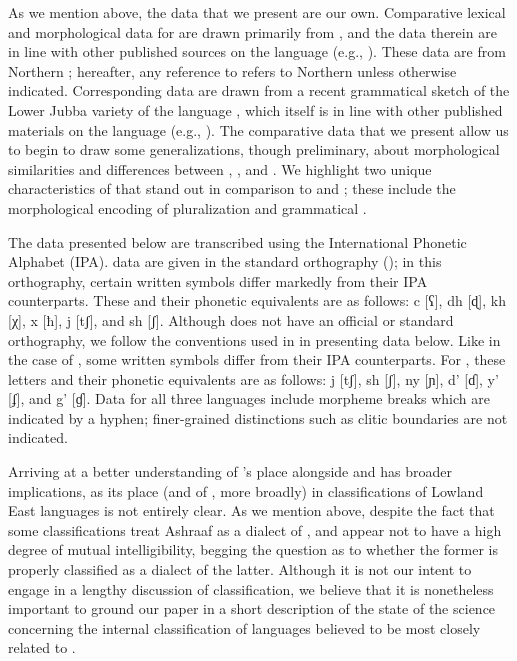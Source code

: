 \documentclass[output=paper]{../langsci/langscibook}
\begin{document}
 As we mention above, the  data that we present are our own. Comparative lexical and morphological data for  are drawn primarily from \citet{Greenetal2015}, and the data therein are in line with other published sources on the language (e.g., \citealt{Bell1953,Saeed1999}). These data are from Northern ; hereafter, any reference to  refers to Northern  unless otherwise indicated. Corresponding  data are drawn from a recent grammatical sketch of the Lower Jubba variety of the language \citet{PasterRanero2015}, which itself is in line with other published materials on the language (e.g., \citealt{Paster2007,Paster2010,PasterMaayGender}). The comparative data that we present allow us to begin to draw some generalizations, though preliminary, about morphological similarities and differences between , , and . We highlight two unique characteristics of  that stand out in comparison to  and ; these include the morphological encoding of pluralization and grammatical . 
 
 The  data presented below are transcribed using the International Phonetic Alphabet (IPA).  data are given in the standard  orthography (\citealt{Andrzejewski1978}); in this orthography, certain written symbols differ markedly from their IPA counterparts. These and their phonetic equivalents are as follows: c [ʕ], dh [ɖ], kh [χ], x [ħ], j [tʃ], and sh [ʃ]. Although  does not have an official or standard orthography, we follow the conventions used in \citet{PasterRanero2015} in presenting
 data below. Like in the case of , some  written symbols differ from their IPA counterparts. For , these letters and their phonetic equivalents are as follows: j [tʃ], sh [ʃ], ny [ɲ], d' [ɗ], y' [ʄ], and g' [ɠ]. Data for all three languages include morpheme breaks which are indicated by a hyphen; finer-grained distinctions such as clitic boundaries are not indicated. 
 
 Arriving at a better understanding of 's place alongside  and  has broader implications, as its place (and of , more broadly) in classifications of Lowland East  languages is not entirely clear. As we mention above, despite the fact that some classifications treat Ashraaf as a dialect of ,  and  appear not to have a high degree of mutual intelligibility, begging the question as to whether the former is properly classified as a dialect of the latter. Although it is not our intent to engage in a lengthy discussion of classification, we believe that it is nonetheless important to ground our paper in a short description of the state of the science concerning the internal classification of languages believed to be most closely related to . 
 
\end{document}
